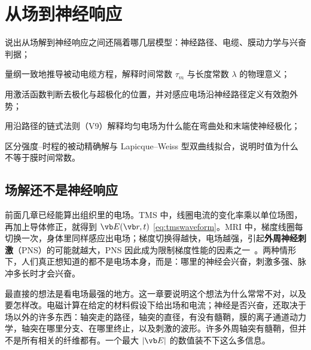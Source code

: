 \chapter{从场到神经响应}\label{ch:neuro}

\begin{chapterguide}
\begin{guidegoals}
\item 说出从场解到神经响应之间还隔着哪几层模型：神经路径、电缆、膜动力学与兴奋判据；
\item 量纲一致地推导被动电缆方程，解释时间常数 $\tau_m$ 与长度常数 $\lambda$ 的物理意义；
\item 用激活函数判断去极化与超极化的位置，并对感应电场沿神经路径定义有效胞外势；
\item 用沿路径的链式法则（V9）解释均匀电场为什么能在弯曲处和末端使神经极化；
\item 区分强度--时程的被动精确解与 Lapicque--Weiss 型双曲线拟合，说明时值为什么不等于膜时间常数。
\end{guidegoals}
\end{chapterguide}

\section{场解还不是神经响应}\label{sec:neuro-gap}

前面几章已经能算出组织里的电场。TMS 中，线圈电流的变化率乘以单位场图，再加上导体修正，就得到 $\vb E(\vb r,t)$ \eqref{eq:tmswaveform}。MRI 中，梯度线圈每切换一次，身体里同样感应出电场；梯度切换得越快，电场越强，引起\textbf{外周神经刺激}（PNS）的可能就越大，PNS 因此成为限制梯度性能的因素之一~\cite{davids}。两种情形下，人们真正想知道的都不是电场本身，而是：哪里的神经会兴奋，刺激多强、脉冲多长时才会兴奋。

最直接的想法是看电场最强的地方。这一章要说明这个想法为什么常常不对，以及要怎样改。电磁计算在给定的材料假设下给出场和电流；神经是否兴奋，还取决于场以外的许多东西：轴突走的路径，轴突的直径，有没有髓鞘，膜的离子通道动力学，轴突在哪里分支、在哪里终止，以及刺激的波形。许多外周轴突有髓鞘，但并不是所有相关的纤维都有。一个最大 $|\vb E|$ 的数值装不下这么多信息。


